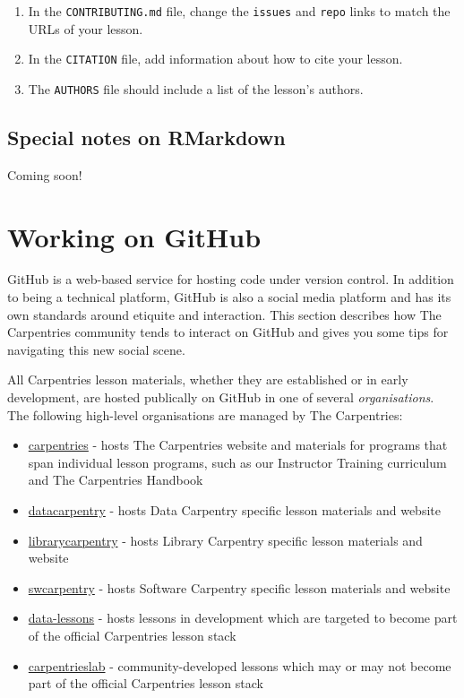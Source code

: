 \documentclass[]{book}
\providecommand{\tightlist}{%
  \setlength{\itemsep}{0pt}\setlength{\parskip}{0pt}}
\begin{document}
\begin{enumerate}
\def\labelenumi{\arabic{enumi}.}
\item
  In the \texttt{CONTRIBUTING.md} file, change the \texttt{issues} and \texttt{repo} links to match the URLs of your lesson.
\item
  In the \texttt{CITATION} file, add information about how to cite your lesson.
\item
  The \texttt{AUTHORS} file should include a list of the lesson's authors.
\end{enumerate}

\hypertarget{special-notes-on-rmarkdown}{%
\subsection{Special notes on RMarkdown}\label{special-notes-on-rmarkdown}}

Coming soon!

\hypertarget{working-on-github}{%
\section{Working on GitHub}\label{working-on-github}}

GitHub is a web-based service for hosting code under version control. In addition to being a technical
platform, GitHub is also a social media platform and has its own standards around etiquite and interaction. This
section describes how The Carpentries community tends to interact on GitHub and gives you some tips for
navigating this new social scene.

All Carpentries lesson materials, whether they are established or in early development, are hosted publically
on GitHub in one of several \emph{organisations}. The following high-level organisations are managed by The Carpentries:

\begin{itemize}
\tightlist
\item
  \href{https://github.com/carpentries}{carpentries} - hosts The Carpentries website and materials for programs that span individual lesson programs, such as our Instructor Training curriculum and The Carpentries Handbook
\item
  \href{https://github.com/datacarpentry}{datacarpentry} - hosts Data Carpentry specific lesson materials and website
\item
  \href{https://github.com/librarycarpentry}{librarycarpentry} - hosts Library Carpentry specific lesson materials and website
\item
  \href{https://github.com/swcarpentry}{swcarpentry} - hosts Software Carpentry specific lesson materials and website
\item
  \href{https://github.com/data-lessons}{data-lessons} - hosts lessons in development which are targeted to become part of the official Carpentries lesson stack
\item
  \href{http://github.com/carpentrieslab}{carpentrieslab} - community-developed lessons which may or may not become part of the official Carpentries lesson stack
\end{itemize}
\end{document}
